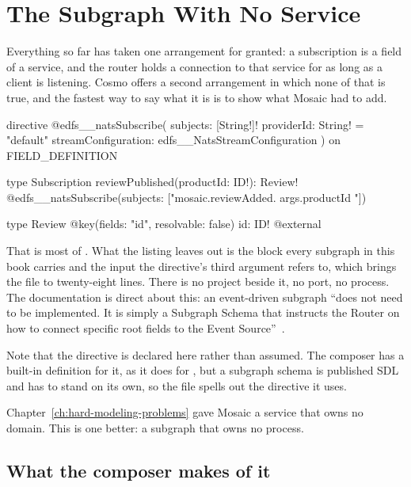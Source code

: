 \section{The Subgraph With No Service}
\label{sec:ch14-the-subgraph-with-no-service}
%

Everything so far has taken one arrangement for granted: a subscription is a
field of a service, and the router holds a connection to that service for as
long as a client is listening. Cosmo offers a second arrangement in which none
of that is true, and the fastest way to say what it is is to show what Mosaic
had to add.

\begin{graphqlsdl}[fontsize=\footnotesize]
directive @edfs__natsSubscribe(
  subjects: [String!]!
  providerId: String! = "default"
  streamConfiguration: edfs__NatsStreamConfiguration
) on FIELD_DEFINITION

type Subscription {
  reviewPublished(productId: ID!): Review!
    @edfs__natsSubscribe(subjects: ["mosaic.reviewAdded.{{ args.productId }}"])
}

type Review @key(fields: "id", resolvable: false) {
  id: ID! @external
}
\end{graphqlsdl}

That is most of . What the listing leaves out is
the  block every subgraph in this book carries and the
 input the directive's third argument
refers to, which brings the file to twenty-eight lines. There is no project
beside it, no port, no process. The documentation is direct about this: an
event-driven subgraph \enquote{does not need to be implemented. It is simply a
Subgraph Schema that instructs the Router on how to connect specific root
fields to the Event Source}~\autocite{cosmodocs2026streams}.

Note that the directive is declared here rather than assumed. The composer has
a built-in definition for it, as it does for , but a subgraph schema
is published SDL and has to stand on its own, so the file spells out the
directive it uses.

Chapter~\ref{ch:hard-modeling-problems} gave Mosaic a service that owns no
domain. This is one better: a subgraph that owns no process.

\subsection*{What the composer makes of it}

